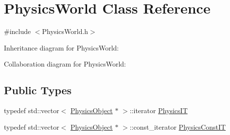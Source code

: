 \hypertarget{classPhysicsWorld}{}\section{Physics\+World Class Reference}
\label{classPhysicsWorld}


{\ttfamily \#include $<$Physics\+World.\+h$>$}



Inheritance diagram for Physics\+World\+:


Collaboration diagram for Physics\+World\+:
\subsection*{Public Types}
\begin{DoxyCompactItemize}
\item 
typedef std\+::vector$<$ \hyperlink{classPhysicsObject}{Physics\+Object} $\ast$ $>$\+::iterator \hyperlink{classPhysicsWorld_ada3fdb31fba17f91c9390b6ac0d62f8b}{Physics\+IT}
\item 
typedef std\+::vector$<$ \hyperlink{classPhysicsObject}{Physics\+Object} $\ast$ $>$\+::const\+\_\+iterator \hyperlink{classPhysicsWorld_ab3617a37c62ed3fcb77f1851a26f2001}{Physics\+Const\+IT}
\end{DoxyCompactItemize}
